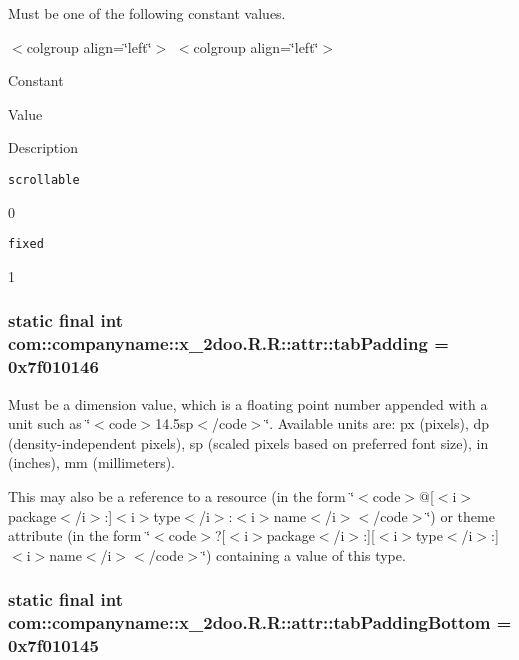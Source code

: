 Must be one of the following constant values. \begin{TabularC}{0}
\hline
\end{TabularC}
$<$colgroup align=\char`\"{}left\char`\"{}$>$ $<$colgroup align=\char`\"{}left\char`\"{}$>$ 

Constant

Value

Description 

{\tt scrollable}

0

{\tt fixed}

1\hypertarget{classcom_1_1companyname_1_1x__2doo_1_1_r_1_1attr_3be2300742e7efece7c3b28538170728}{
\subsubsection[{tabPadding}]{\setlength{\rightskip}{0pt plus 5cm}static final int com::companyname::x\_\-2doo.R.R::attr::tabPadding = 0x7f010146}}
\label{classcom_1_1companyname_1_1x__2doo_1_1_r_1_1attr_3be2300742e7efece7c3b28538170728}


Must be a dimension value, which is a floating point number appended with a unit such as \char`\"{}$<$code$>$14.5sp$<$/code$>$\char`\"{}. Available units are: px (pixels), dp (density-independent pixels), sp (scaled pixels based on preferred font size), in (inches), mm (millimeters). 

This may also be a reference to a resource (in the form \char`\"{}$<$code$>$@\mbox{[}$<$i$>$package$<$/i$>$:\mbox{]}$<$i$>$type$<$/i$>$:$<$i$>$name$<$/i$>$$<$/code$>$\char`\"{}) or theme attribute (in the form \char`\"{}$<$code$>$?\mbox{[}$<$i$>$package$<$/i$>$:\mbox{]}\mbox{[}$<$i$>$type$<$/i$>$:\mbox{]}$<$i$>$name$<$/i$>$$<$/code$>$\char`\"{}) containing a value of this type. \hypertarget{classcom_1_1companyname_1_1x__2doo_1_1_r_1_1attr_600d6830eb7b29b2cd3f72d047542b55}{
\subsubsection[{tabPaddingBottom}]{\setlength{\rightskip}{0pt plus 5cm}static final int com::companyname::x\_\-2doo.R.R::attr::tabPaddingBottom = 0x7f010145}}
\label{classcom_1_1companyname_1_1x__2doo_1_1_r_1_1attr_600d6830eb7b29b2cd3f72d047542b55}


